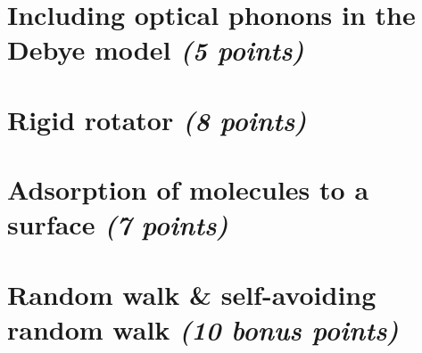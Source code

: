 \documentclass[11 pt]{article}
\begin{document}
    \section{Including optical phonons in the Debye model
        \textit{(5 points)}
    }
    
    \newpage

    \section{Rigid rotator \textit{(8 points)}}
    
    \newpage

    \section{Adsorption of molecules to a surface \textit{(7 points)}}
    
    \newpage

    \section{Random walk \& self-avoiding random walk 
        \textit{(10 bonus points)}
    }
    
\end{document}
